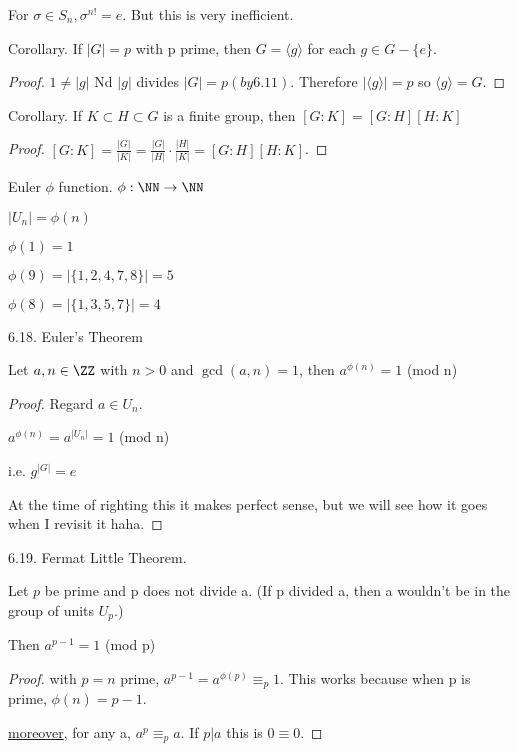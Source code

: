 \documentclass[11pt]{scrartcl}
\begin{document}
\begin{example}
  For $\sigma \in S_n, \sigma^{n!} = e$. But this is very inefficient.
\end{example}

\begin{theorem}
  Corollary. If $|G| = p$ with p prime, then $G = \langle g \rangle $ for each $g \in G - \{e\}$.
  \begin{proof}
    $1 \neq |g|$ Nd $|g|$ divides $|G| = p (by 6.11)$. Therefore $|\langle g \rangle | = p$ so $\langle g \rangle = G$.
  \end{proof}
\end{theorem}

\begin{theorem}
  Corollary. If $K \subset H \subset G$ is a finite group, then $\left[G:K\right] = \left[G:H\right]\left[H:K\right]$

   \begin{proof}
     $\left[G:K\right] = \frac{|G|}{|K|} = \frac{|G|}{|H|} \cdot \frac{|H|}{|K|} = \left[G:H\right]\left[H:K\right]$.
  \end{proof}
\end{theorem}

\begin{definition}
  Euler $\phi$ function. $\phi:\NN\to\NN$

  $|U_n| = \phi(n)$
   \begin{example}
     $\phi(1) = 1$ 

     $\phi(9) = |\{1, 2, 4, 7, 8\}| = 5$ 

     $\phi(8) = |\{1, 3, 5, 7\}| = 4$
  \end{example}
\end{definition}

\begin{theorem}
  6.18. Euler's Theorem

  Let $a, n \in \ZZ$ with $n > 0$ and $\gcd(a, n) = 1$, then $a^{\phi(n)} = 1$ (mod n)

  \begin{proof}
    Regard $a \in U_n$.

    $a^{\phi(n)} = a^{|U_n|} = 1$ (mod n)
    
    i.e. $g^{|G|} = e$

    At the time of righting this it makes perfect sense, but we will see how it goes when I revisit it haha.
  \end{proof}
\end{theorem}

\begin{theorem}
  6.19. Fermat Little Theorem.

  Let $p$ be prime and p does not divide a. (If p divided a, then a wouldn't be in the group of units $U_p$.)

  Then $a^{p - 1} = 1$ (mod p)

  \begin{proof}
    with $p = n$ prime, $a^{p - 1} = a^{\phi(p)} \equiv_p 1$. This works because when p is prime, $\phi(n) = p - 1$.

    \ul{moreover}, for any a, $a^p \equiv_p a$. If $p | a$ this is $0 \equiv 0$.
  \end{proof}
\end{theorem}
\end{document}
